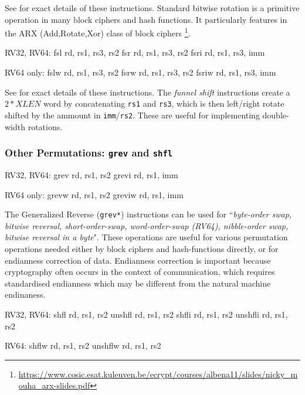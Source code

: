 See \cite[Section 3.1.1]{riscv:bitmanip:draft} for exact details of
these instructions.
Standard bitwise rotation is a primitive operation in many block ciphers and
hash functions.
It particularly features in the ARX (Add,Rotate,Xor) class of
block ciphers
\footnote{\url{https://www.cosic.esat.kuleuven.be/ecrypt/courses/albena11/slides/nicky_mouha_arx-slides.pdf}}.

\begin{isa}
RV32, RV64:
    fsl   rd, rs1, rs3, rs2
    fsr   rd, rs1, rs3, rs2
    fsri  rd, rs1, rs3, imm

RV64 only:
    fslw  rd, rs1, rs3, rs2
    fsrw  rd, rs1, rs3, rs2
    fsriw rd, rs1, rs3, imm
\end{isa}

See \cite[Section 2.9.3]{riscv:bitmanip:draft} for exact details of
these instructions.
The {\em funnel shift} instructions create a $2*XLEN$ word by
concatenating {\tt rs1} and {\tt rs3}, which is then
left/right rotate shifted by the ammount in {\tt imm}/{\tt rs2}.
These are useful for implementing double-width rotations.



\subsubsection{Other Permutations: {\tt grev} and {\tt shfl}}

\begin{isa}
RV32, RV64:
    grev rd, rs1, rs2
    grevi rd, rs1, imm

RV64 only:
    grevw rd, rs1, rs2
    greviw rd, rs1, imm
\end{isa}

The Generalized Reverse ({\tt grev*}) instructions can be used for 
``{\em byte-order swap, bitwise reversal, short-order-swap,
word-order-swap (RV64), nibble-order swap, bitwise reversal in a byte}".
These operations are useful for various permutation operations
needed either by block ciphers and hash-functions directly, or for
endianness correction of data.
Endianness correction is important because
cryptography often occurs in the context of communication, which requires
standardised endianness which may be different from the natural machine
endinaness.


\begin{isa}
RV32, RV64:
    shfl    rd, rs1, rs2
    unshfl  rd, rs1, rs2
    shfli   rd, rs1, rs2
    unshfli rd, rs1, rs2

RV64:
    shflw   rd, rs1, rs2
    unshflw rd, rs1, rs2
\end{isa}

